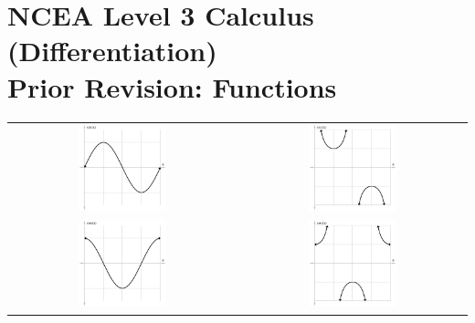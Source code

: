 
\usepackage{longtable}


\section*{NCEA Level 3 Calculus (Differentiation)\\Prior Revision: Functions}

\begin{center}
  \begin{longtable}{cc}
    \includegraphics[width=0.4\textwidth]{sin}&
    \includegraphics[width=0.4\textwidth]{csc}\\
    \includegraphics[width=0.4\textwidth]{cos}&
    \includegraphics[width=0.4\textwidth]{sec}\\

\end{longtable}
\end{center}

